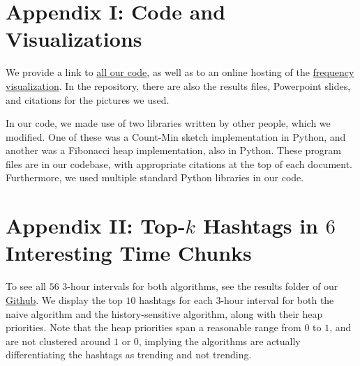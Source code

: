 \documentclass[twoside]{article}
\begin{document}
{\section{Appendix I: Code and Visualizations} \label{sec:Appendix_code_viz}

We provide a link to \href{https://github.com/kiranvodrahalli/cos521/}{all our code}, as well as to an online hosting of the \href{http://www.princeton.edu/~awlee/trends.html}{frequency visualization}. In the repository, there are also the results files, Powerpoint slides, and citations for the pictures we used.

In our code, we made use of two libraries written by other people, which we modified. One of these was a Count-Min sketch implementation in Python, and another was a Fibonacci heap implementation, also in Python. These program files are in our codebase, with appropriate citations at the top of each document. Furthermore, we used multiple standard Python libraries in our code.

\section{Appendix II: Top-$k$ Hashtags in $6$ Interesting Time Chunks} \label{sec:Appendix_topk}

To see all $56$ $3$-hour intervals for both algorithms, see the results folder of our \href{https://github.com/kiranvodrahalli/cos521/}{Github}. We display the top $10$ hashtags for each $3$-hour interval for both the naive algorithm and the history-sensitive algorithm, along with their heap priorities. Note that the heap priorities span a reasonable range from $0$ to $1$, and are not clustered around $1$ or $0$, implying the algorithms are actually differentiating the hashtags as trending and not trending. 

}

\end{document}
